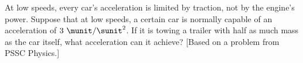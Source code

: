         At low speeds, every car's acceleration is limited by traction, not by the
        engine's power.
        Suppose that at low speeds, a certain car is normally capable of an acceleration of $3\ \munit/\sunit^2$. 
        If it is towing a trailer with half as much mass as the car
        itself, what acceleration can it achieve? [Based on a
        problem from PSSC Physics.]
